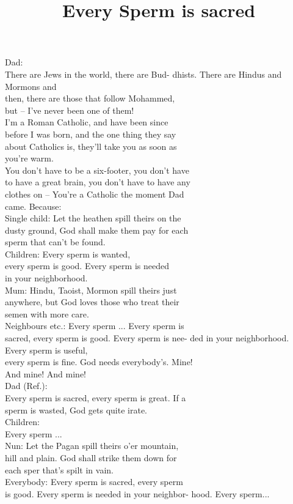 \title{Every Sperm is sacred} 

Dad: \\ 
There are Jews in the world, there are Bud-
dhists. There are Hindus and Mormons and \\ 
then, there are those that follow Mohammed, \\ 
but – I’ve never been one of them! \\ 
I’m a Roman Catholic, and have been since \\ 
before I was born, and the one thing they say \\ 
about Catholics is, they’ll take you as soon as \\ 
you’re warm. \\ 
You don’t have to be a six-footer, you don’t have \\ 
to have a great brain, you don’t have to have any \\ 
clothes on – You’re a Catholic the moment Dad \\ 
came. Because: \\ 
Single child: Let the heathen spill theirs on the \\ 
dusty ground, God shall make them pay for each \\ 
sperm that can’t be found. \\ 
Children: Every sperm is wanted, \\ 
every sperm is good. Every sperm is needed \\ 
in your neighborhood. \\ 
Mum: Hindu, Taoist, Mormon spill theirs just \\ 
anywhere, but God loves those who treat their \\ 
semen with more care. \\ 
Neighbours etc.: Every sperm ... Every sperm is \\ 
sacred, every sperm is good. Every sperm is nee-
ded in your neighborhood. Every sperm is useful, \\ 
every sperm is fine. God needs everybody’s. Mine! \\ 
And mine! And mine! \\ 
Dad (Ref.): \\ 
Every sperm is sacred, every sperm is great. If a \\ 
sperm is wasted, God gets quite irate. \\ 
Children: \\ 
Every sperm ... \\ 
Nun: Let the Pagan spill theirs o’er mountain, \\ 
hill and plain. God shall strike them down for \\ 
each sper that’s spilt in vain. \\ 
Everybody: Every sperm is sacred, every sperm \\ 
is good. Every sperm is needed in your neighbor-
hood. Every sperm...

